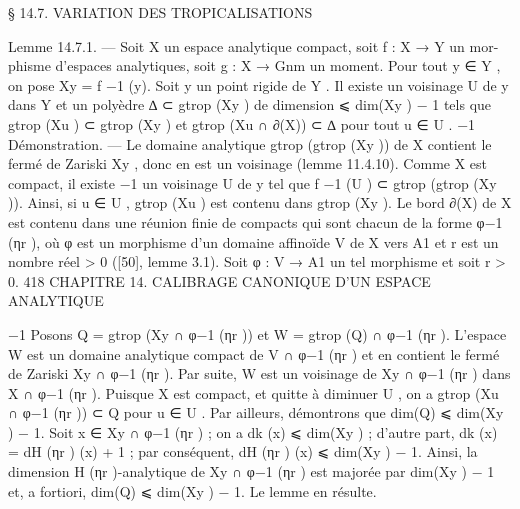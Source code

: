 \documentclass[
  10pt,
]{article}
\newenvironment{Shaded}{}{}
\newcommand{\NormalTok}[1]{#1}
\begin{document}
\begin{Shaded}
\begin{Highlighting}[]

\NormalTok{                § 14.7. VARIATION DES TROPICALISATIONS}

\NormalTok{Lemme 14.7.1. — Soit X un espace analytique compact, soit f : X → Y un mor{-}}
\NormalTok{phisme d’espaces analytiques, soit g : X → Gnm un moment. Pour tout y ∈ Y , on pose}
\NormalTok{Xy = f −1 (y). Soit y un point rigide de Y . Il existe un voisinage U de y dans Y et un}
\NormalTok{polyèdre ∆ ⊂ gtrop (Xy ) de dimension ⩽ dim(Xy ) − 1 tels que gtrop (Xu ) ⊂ gtrop (Xy ) et}
\NormalTok{gtrop (Xu ∩ ∂(X)) ⊂ ∆ pour tout u ∈ U .}
\NormalTok{                                               −1}
\NormalTok{Démonstration. — Le domaine analytique gtrop      (gtrop (Xy )) de X contient le fermé de}
\NormalTok{Zariski Xy , donc en est un voisinage (lemme 11.4.10). Comme X est compact, il existe}
\NormalTok{                                           −1}
\NormalTok{un voisinage U de y tel que f −1 (U ) ⊂ gtrop (gtrop (Xy )). Ainsi, si u ∈ U , gtrop (Xu ) est}
\NormalTok{contenu dans gtrop (Xy ).}
\NormalTok{   Le bord ∂(X) de X est contenu dans une réunion finie de compacts qui sont chacun de}
\NormalTok{la forme φ−1 (ηr ), où φ est un morphisme d’un domaine affinoïde V de X vers A1 et r est}
\NormalTok{un nombre réel \textgreater{} 0 ([50], lemme 3.1). Soit φ : V → A1 un tel morphisme et soit r \textgreater{} 0.}
\NormalTok{418          CHAPITRE 14. CALIBRAGE CANONIQUE D’UN ESPACE ANALYTIQUE}

\NormalTok{                                            −1}
\NormalTok{Posons Q = gtrop (Xy ∩ φ−1 (ηr )) et W = gtrop  (Q) ∩ φ−1 (ηr ). L’espace W est un domaine}
\NormalTok{analytique compact de V ∩ φ−1 (ηr ) et en contient le fermé de Zariski Xy ∩ φ−1 (ηr ). Par}
\NormalTok{suite, W est un voisinage de Xy ∩ φ−1 (ηr ) dans X ∩ φ−1 (ηr ). Puisque X est compact, et}
\NormalTok{quitte à diminuer U , on a gtrop (Xu ∩ φ−1 (ηr )) ⊂ Q pour u ∈ U .}
\NormalTok{  Par ailleurs, démontrons que dim(Q) ⩽ dim(Xy ) − 1. Soit x ∈ Xy ∩ φ−1 (ηr ) ;}
\NormalTok{on a dk (x) ⩽ dim(Xy ) ; d’autre part, dk (x) = dH (ηr ) (x) + 1 ; par conséquent,}
\NormalTok{dH (ηr ) (x) ⩽ dim(Xy ) − 1. Ainsi, la dimension H (ηr ){-}analytique de Xy ∩ φ−1 (ηr )}
\NormalTok{est majorée par dim(Xy ) − 1 et, a fortiori, dim(Q) ⩽ dim(Xy ) − 1.}
\NormalTok{  Le lemme en résulte.}


\end{Highlighting}
\end{Shaded}
\end{document}
